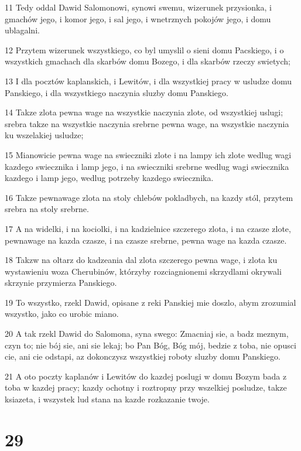 \par 11 Tedy oddal Dawid Salomonowi, synowi swemu, wizerunek przysionka, i gmachów jego, i komor jego, i sal jego, i wnetrznych pokojów jego, i domu ublagalni.
\par 12 Przytem wizerunek wszystkiego, co byl umyslil o sieni domu Pacskiego, i o wszystkich gmachach dla skarbów domu Bozego, i dla skarbów rzeczy swietych;
\par 13 I dla pocztów kaplanskich, i Lewitów, i dla wszystkiej pracy w usludze domu Panskiego, i dla wszystkiego naczynia sluzby domu Panskiego.
\par 14 Takze zlota pewna wage na wszystkie naczynia zlote, od wszystkiej uslugi; srebra takze na wszystkie naczynia srebrne pewna wage, na wszystkie naczynia ku wszelakiej usludze;
\par 15 Mianowicie pewna wage na swieczniki zlote i na lampy ich zlote wedlug wagi kazdego swiecznika i lamp jego, i na swieczniki srebrne wedlug wagi swiecznika kazdego i lamp jego, wedlug potrzeby kazdego swiecznika.
\par 16 Takze pewnawage zlota na stoly chlebów pokladbych, na kazdy stól, przytem srebra na stoly srebrne.
\par 17 A na widelki, i na kociolki, i na kadzielnice szczerego zlota, i na czasze zlote, pewnawage na kazda czasze, i na czasze srebrne, pewna wage na kazda czasze.
\par 18 Takzw na oltarz do kadzeania dal zlota szczerego pewna wage, i zlota ku wystawieniu woza Cherubinów, którzyby rozciagnionemi skrzydlami okrywali skrzynie przymierza Panskiego.
\par 19 To wszystko, rzekl Dawid, opisane z reki Panskiej mie doszlo, abym zrozumial wszystko, jako co urobic miano.
\par 20 A tak rzekl Dawid do Salomona, syna swego: Zmacniaj sie, a badz meznym, czyn to; nie bój sie, ani sie lekaj; bo Pan Bóg, Bóg mój, bedzie z toba, nie opusci cie, ani cie odstapi, az dokonczysz wszystkiej roboty sluzby domu Panskiego.
\par 21 A oto poczty kaplanów i Lewitów do kazdej poslugi w domu Bozym bada z toba w kazdej pracy; kazdy ochotny i roztropny przy wszelkiej posludze, takze ksiazeta, i wszystek lud stana na kazde rozkazanie twoje.

\chapter{29}

